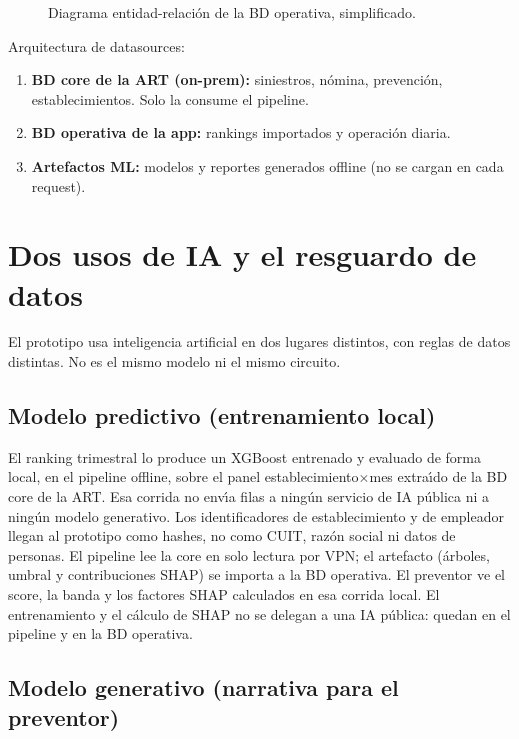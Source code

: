 \begin{figure}[H]
	\centering
	
	\caption{Diagrama entidad-relaci\'on de la BD operativa, simplificado. \fuentepropia}
	\label{fig:er}
\end{figure}

Arquitectura de datasources:
\begin{enumerate}
	\item \textbf{BD core de la ART (on-prem):} siniestros, n\'omina, prevenci\'on, establecimientos. Solo la consume el pipeline.
	\item \textbf{BD operativa de la app:} rankings importados y operaci\'on diaria.
	\item \textbf{Artefactos ML:} modelos y reportes generados offline (no se cargan en cada request).
\end{enumerate}

\section{Dos usos de IA y el resguardo de datos}\label{sec:ia-datos}

El prototipo usa inteligencia artificial en dos lugares distintos, con reglas de datos distintas.
No es el mismo modelo ni el mismo circuito.

\subsection*{Modelo predictivo (entrenamiento local)}

El ranking trimestral lo produce un XGBoost entrenado y evaluado de forma local, en el pipeline offline, sobre el panel establecimiento$\times$mes extra\'{\i}do de la BD core de la ART.
Esa corrida no env\'{\i}a filas a ning\'un servicio de IA p\'ublica ni a ning\'un modelo generativo.
Los identificadores de establecimiento y de empleador llegan al prototipo como hashes, no como CUIT, raz\'on social ni datos de personas.
El pipeline lee la core en solo lectura por VPN; el artefacto (\'arboles, umbral y contribuciones SHAP) se importa a la BD operativa.
El preventor ve el score, la banda y los factores SHAP calculados en esa corrida local.
El entrenamiento y el c\'alculo de SHAP no se delegan a una IA p\'ublica: quedan en el pipeline y en la BD operativa.

\subsection*{Modelo generativo (narrativa para el preventor)}

